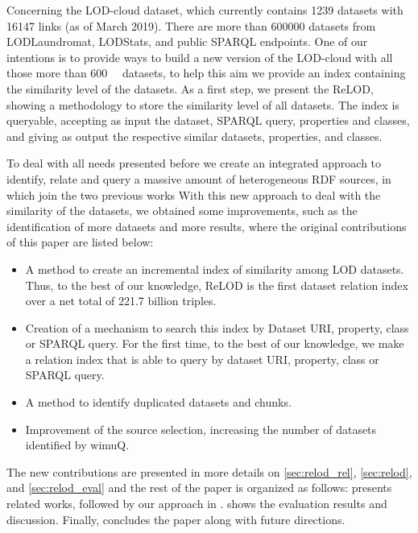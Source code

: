 \documentclass[sw]{iosart2x}
\begin{document}
Concerning the LOD-cloud dataset, which currently contains \num{1239} datasets with \num{16147} links (as of March 2019)\cite{lodcloud}. There are more than \num{600000} datasets from LODLaundromat, LODStats, and public SPARQL endpoints. One of our intentions is to provide ways to build a new version of the LOD-cloud with all those more than \SI{600}{\kilo\nothing} datasets, to help this aim we provide an index containing the similarity level of the datasets. As a first step, we present the ReLOD, showing a methodology to store the similarity level of all datasets. The index is queryable, accepting as input the dataset, SPARQL query, properties and classes, and giving as output the respective similar datasets, properties, and classes.

To deal with all needs presented before we create an integrated approach to identify, relate and query a massive amount of heterogeneous RDF sources, in which join the two previous works\cite{valdestilhas2018my, valdestilhas2019more} 
With this new approach to deal with the similarity of the datasets, we obtained some improvements, such as the identification of more datasets and more results, where the original contributions of this paper are listed below:
\begin{itemize}
    \item A method to create an incremental index of similarity among LOD datasets. Thus, to the best of our knowledge, ReLOD is the first dataset relation index over a net total of 221.7 billion triples.
    \item Creation of a mechanism to search this index by Dataset URI, property, class or SPARQL query. For the first time, to the best of our knowledge, we make a relation index that is able to query by dataset URI, property, class or SPARQL query.
    \item A method to identify duplicated datasets and chunks.
    \item Improvement of the source selection, increasing the number of datasets identified by wimuQ\cite{valdestilhas2019more}.
\end{itemize}

The new contributions are presented in more details on \cref{sec:relod_rel}, \cref{sec:relod}, and \cref{sec:relod_eval} and the rest of the paper is organized as follows:
 presents related works, followed by our approach in .  shows the evaluation results and discussion. Finally,  concludes the paper along with future directions.
\end{document}

